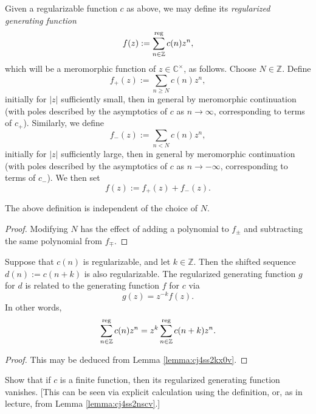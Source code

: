 \documentclass[reqno]{amsart} 
\begin{document}
\begin{definition}\label{definition:cj4ss5ec2g}
  Given a regularizable function $c$ as above, we may define its \emph{regularized generating function}
  \begin{equation}\label{eq:cj4ss5ffxd}
    f(z) := \sum_{n \in \mathbb{Z} }^{\operatorname{reg}} c(n) z^n,
  \end{equation}
  which will be a meromorphic function of $z \in \mathbb{C}^\times$, as follows.  Choose $N \in \mathbb{Z}$.  Define
  \begin{equation*}
    f_+(z) := \sum_{n \geq N} c(n) z^n,
  \end{equation*}
  initially for $\lvert z \rvert$ sufficiently small, then in general by meromorphic continuation (with poles described by the asymptotics of $c$ as $n \rightarrow \infty$, corresponding to terms of $c_+$).  Similarly, we define
  \begin{equation*}
    f_-(z) := \sum_{n < N} c(n) z^n,
  \end{equation*}
  initially for $\lvert z \rvert$ sufficiently large, then in general by meromorphic continuation (with poles described by the asymptotics of $c$ as $n \rightarrow -\infty$, corresponding to terms of $c_-$).  We then set
  \begin{equation*}
    f(z) := f_+(z) + f_-(z).
  \end{equation*}
\end{definition}
\begin{lemma}\label{lemma:cj4ss2kx0v}
  The above definition is independent of the choice of $N$.
\end{lemma}
\begin{proof}
  Modifying $N$ has the effect of adding a polynomial to $f_{\pm}$ and subtracting the same polynomial from $f_{\mp}$.
\end{proof}
\begin{lemma}\label{lemma:cj4ss2nscv}
  Suppose that $c(n)$ is regularizable, and let $k \in \mathbb{Z}$.  Then the shifted sequence $d(n) := c(n+k)$ is also regularizable.  The regularized generating function $g$ for $d$ is related to the generating function $f$ for $c$ via
  \begin{equation*}
    g(z) = z^{-k} f(z).
  \end{equation*}
  In other words,
  \begin{equation*}
    \sum_{n \in \mathbb{Z}}^{\operatorname{reg}} c(n) z^n
    = 
    z^k \sum_{n \in \mathbb{Z}}^{\operatorname{reg}} c(n+k) z^n.
  \end{equation*}
\end{lemma}
\begin{proof}
  This may be deduced from Lemma \ref{lemma:cj4ss2kx0v}.
\end{proof}
\begin{exercise}\label{exercise:cj4ss5ia8l}
  Show that if $c$ is a finite function, then its regularized generating function vanishes.  [This can be seen via explicit calculation using the definition, or, as in lecture, from Lemma \ref{lemma:cj4ss2nscv}.]
\end{exercise}
\end{document}
